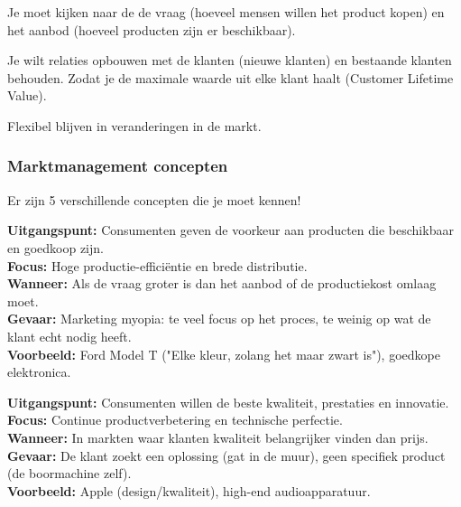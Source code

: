 \documentclass[a4paper,11pt]{article}
\begin{document}
Je moet kijken naar de de vraag (hoeveel mensen willen het product kopen)
en het aanbod (hoeveel producten zijn er beschikbaar).
\newline

Je wilt relaties opbouwen met de klanten (nieuwe klanten) en bestaande klanten behouden.
Zodat je de maximale waarde uit elke klant haalt (Customer Lifetime Value).
\newline

Flexibel blijven in veranderingen in de markt.


\subsubsection{Marktmanagement concepten}

Er zijn 5 verschillende concepten die je moet kennen!



\begin{tcolorbox}[schoolstyle, title=1. Productieconcept, colframe=schoolBlue!80!black, colback=white]
    \textbf{Uitgangspunt:} Consumenten geven de voorkeur aan producten die beschikbaar en goedkoop zijn. \\
    \textbf{Focus:} Hoge productie-efficiëntie en brede distributie. \\
    \textbf{Wanneer:} Als de vraag groter is dan het aanbod of de productiekost omlaag moet. \\
    \textbf{Gevaar:} Marketing myopia: te veel focus op het proces, te weinig op wat de klant echt nodig heeft. \\
    \textbf{Voorbeeld:} Ford Model T ("Elke kleur, zolang het maar zwart is"), goedkope elektronica.
\end{tcolorbox}

\begin{tcolorbox}[schoolstyle, title=2. Productconcept, colframe=schoolBlue!80!black, colback=white]
    \textbf{Uitgangspunt:} Consumenten willen de beste kwaliteit, prestaties en innovatie. \\
    \textbf{Focus:} Continue productverbetering en technische perfectie. \\
    \textbf{Wanneer:} In markten waar klanten kwaliteit belangrijker vinden dan prijs. \\
    \textbf{Gevaar:} De klant zoekt een oplossing (gat in de muur), geen specifiek product (de boormachine zelf). \\
    \textbf{Voorbeeld:} Apple (design/kwaliteit), high-end audioapparatuur.
\end{tcolorbox}
\end{document}
